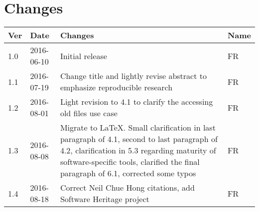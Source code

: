 \documentclass[letterpaper,11pt]{article}
\begin{document}
\printbibliography


\clearpage
\addtocounter{page}{-1}  %

\section*{Changes}
\label{sec:changes}
\pagestyle{empty}
\centering
\begin{tabularx}{\textwidth}{llXl}
	\toprule
	Ver & Date & Changes & Name \\ 
	\midrule
	1.0 & 2016-06-10 & Initial release & FR \\ 
	1.1 & 2016-07-19 & Change title and lightly revise abstract to emphasize reproducible research & FR \\ 
	1.2 & 2016-08-01 & Light revision to 4.1 to clarify the accessing old files use case & FR \\ 
	1.3 & 2016-08-08 & Migrate to \LaTeX. Small clarification in last paragraph of 4.1, second to last paragraph of 4.2, clarification in 5.3 regarding maturity of software-specific tools, clarified the final paragraph of 6.1, corrected some typos & FR \\ 
	1.4 & 2016-08-18 & Correct Neil Chue Hong citations, add Software Heritage project & FR\\
	\bottomrule

\end{tabularx} 
\end{document}
